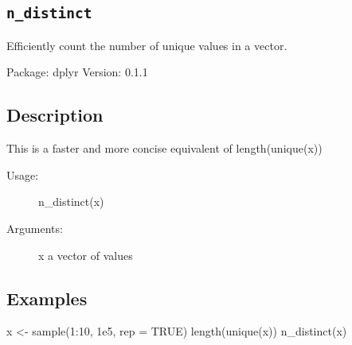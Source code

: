 
\subsection{\texttt{n_distinct}}

Efficiently count the number of unique values in a vector.


Package:  dplyr
Version:  0.1.1

\subsection{Description}
This is a faster and more concise equivalent of length(unique(x))


\begin{description}
\item[Usage:] n_distinct(x)

\item[Arguments:] x a vector of values
\end{description}
\subsection{Examples}

x <- sample(1:10, 1e5, rep = TRUE)
length(unique(x))
n_distinct(x)

